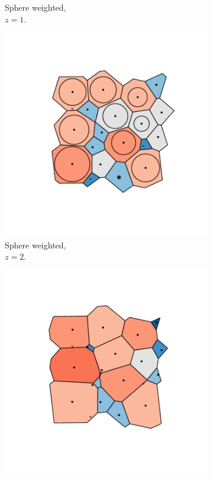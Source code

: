 \begin{figure}[tb]
\begin{subfigure}[b]{0.23\textwidth}
         \caption{Sphere weighted, \\$z=1$.}
         \label{fig:cut10a}
     \end{subfigure}
     \hfill
      \begin{subfigure}[b]{0.23\textwidth}
         \centering
         \includegraphics[width=\textwidth]{./figures/quasi2d/cut_z20_a.pdf}
         \caption{Sphere weighted, \\$z=2$.}
         \label{fig:cut20a}
     \end{subfigure}
     \hfill
      \begin{subfigure}[b]{0.23\textwidth}
         \centering
         \includegraphics[width=\textwidth]{./figures/quasi2d/cut_z40_a.pdf}

\end{subfigure}
\end{figure}
